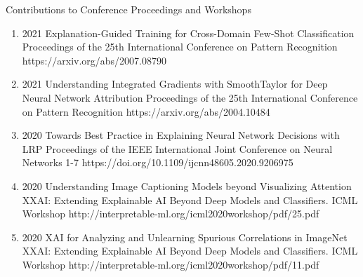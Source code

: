\documentclass[10pt,a4paper]{article} %
\begin{document}
\headedsection %
{Contributions to Conference Proceedings and Workshops}{}
{
    \begin{enumerate}

        \item[] 
                                {2021}
                                {Explanation-Guided Training for Cross-Domain Few-Shot Classification}
                                {Proceedings of the 25th International Conference on Pattern Recognition}
                                {}
                                {https://arxiv.org/abs/2007.08790}

        \item[] 
                                {2021}
                                {Understanding Integrated Gradients with SmoothTaylor for Deep Neural Network Attribution}
                                {Proceedings of the 25th International Conference on Pattern Recognition}
                                {}
                                {https://arxiv.org/abs/2004.10484}

        \item[] 
                                {2020}
                                {Towards Best Practice in Explaining Neural Network Decisions with LRP}
                                {Proceedings of the IEEE International Joint Conference on Neural Networks}
                                {1-7}
                                {https://doi.org/10.1109/ijcnn48605.2020.9206975}

        \item[] 
                                {2020}
                                {Understanding Image Captioning Models beyond Visualizing Attention}
                                {XXAI: Extending Explainable AI Beyond Deep Models and Classifiers. ICML Workshop}
                                {}
                                {http://interpretable-ml.org/icml2020workshop/pdf/25.pdf}


        \item[] 
                                {2020}
                                {XAI for Analyzing and Unlearning Spurious Correlations in ImageNet}
                                {XXAI: Extending Explainable AI Beyond Deep Models and Classifiers. ICML Workshop}
                                {}
                                {http://interpretable-ml.org/icml2020workshop/pdf/11.pdf}



\end{enumerate}}
\end{document}
